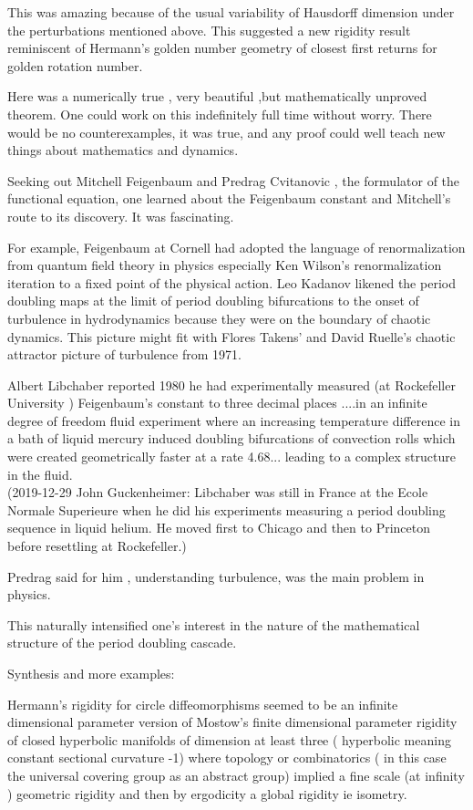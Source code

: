 \begin{description}
This was amazing  because of the usual variability of Hausdorff dimension under  the perturbations mentioned above.  This suggested a  new rigidity result reminiscent of Hermann's golden number geometry of closest first returns for golden rotation number.

 Here was a  numerically true , very beautiful ,but  mathematically unproved theorem.  One could  work on  this indefinitely full time without worry. There would be no counterexamples, it was true, and any proof could well teach new things about mathematics and dynamics.

 Seeking out   Mitchell Feigenbaum and Predrag Cvitanovic , the formulator of  the functional equation,  one learned about the  Feigenbaum constant  and  Mitchell's route to  its discovery. It was fascinating.

For example, Feigenbaum at Cornell had adopted the language of renormalization from quantum field theory in physics especially
 Ken Wilson's renormalization iteration to a fixed point of the physical  action.
Leo Kadanov likened the period doubling maps at the limit of period doubling bifurcations to the onset of turbulence in hydrodynamics because  they were on the  boundary of chaotic dynamics.
This picture  might fit  with  Flores Takens' and David Ruelle's chaotic attractor picture of turbulence from 1971.

Albert  Libchaber reported 1980  he had experimentally measured (at
Rockefeller University ) Feigenbaum's constant to three decimal places
....in an infinite degree of freedom  fluid experiment   where an
increasing temperature difference in a bath of liquid mercury  induced
doubling bifurcations of convection rolls  which were created
geometrically  faster at a rate 4.68...  leading to a  complex structure
in the fluid.
\\(2019-12-29 John Guckenheimer: Libchaber was still in France at the Ecole
Normale Superieure when he did his experiments measuring a period
doubling sequence in liquid helium. He moved first to Chicago and then to
Princeton before resettling at Rockefeller.)

Predrag said for him , understanding turbulence, was the main problem in physics.

 This naturally intensified one's interest in the nature of the mathematical structure of the period doubling cascade.




 Synthesis and more examples:

Hermann's rigidity for circle diffeomorphisms   seemed to be  an infinite dimensional  parameter  version  of  Mostow's finite dimensional  parameter  rigidity of closed hyperbolic manifolds of dimension  at least three ( hyperbolic meaning constant sectional curvature -1)  where topology or combinatorics ( in this case the universal covering group as an abstract group)  implied a fine scale (at infinity ) geometric  rigidity and then by ergodicity a global rigidity ie isometry.


\end{description}
